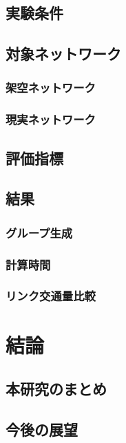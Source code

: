 \section{実験条件}

\section{対象ネットワーク}

\subsection{架空ネットワーク}

\subsection{現実ネットワーク}

\section{評価指標}

\section{結果}

\subsection{グループ生成}

\subsection{計算時間}

\subsection{リンク交通量比較}

\chapter{結論}

\section{本研究のまとめ}

\section{今後の展望}
